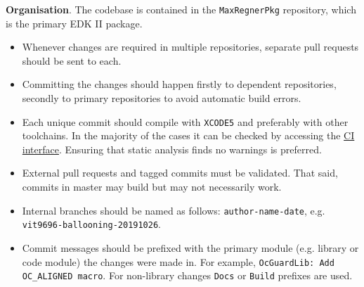 \documentclass[]{article}
\providecommand{\tightlist}{%
  \setlength{\itemsep}{0pt}\setlength{\parskip}{0pt}}
\begin{document}
\textbf{Organisation}. The codebase is contained in the \texttt{MaxRegnerPkg} repository,
which is the primary EDK II package.
\begin{itemize}
\tightlist
\item Whenever changes are required in multiple repositories, separate pull requests should
be sent to each.
\item Committing the changes should happen firstly to dependent repositories, secondly to
primary repositories to avoid automatic build errors.
\item Each unique commit should compile with \texttt{XCODE5} and preferably with other
toolchains. In the majority of the cases it can be checked by accessing the
\href{https://travis-ci.com/acidanthera}{CI interface}. Ensuring that static analysis finds
no warnings is preferred.
\item External pull requests and tagged commits must be validated. That said, commits in
master may build but may not necessarily work.
\item Internal branches should be named as follows: \texttt{author-name-date}, e.g.
\texttt{vit9696-ballooning-20191026}.
\item Commit messages should be prefixed with the primary module (e.g. library or code module) the
changes were made in. For example, \texttt{OcGuardLib: Add OC\_ALIGNED macro}. For non-library changes
\texttt{Docs} or \texttt{Build} prefixes are used.
\end{itemize}
\end{document}

